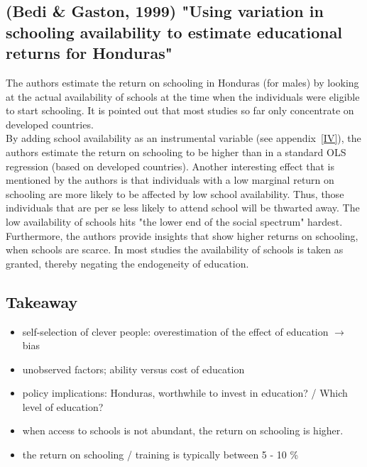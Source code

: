 \documentclass[12pt,a4paper]{article}
\begin{document}
  \subsection{(Bedi \& Gaston, 1999) "Using variation in schooling availability to estimate educational returns for Honduras"} %
  \label{sub:bedi}
  The authors estimate the return on schooling in Honduras (for males) by looking at the actual availability of schools at the
  time when the individuals were eligible to start schooling. It is pointed out that most studies so far only concentrate
  on developed countries.\\
  By adding school availability as an instrumental variable (see appendix~\ref{IV}), the authors estimate the return
  on schooling to be higher than in a standard OLS regression (based on developed countries). Another interesting effect
  that is mentioned by the authors is that individuals with a low marginal return on schooling are more likely to
  be affected by low school availability. Thus, those individuals that are per se less likely to attend school will
  be thwarted away. The low availability of schools hits "the lower end of the social spectrum" hardest.\\
  Furthermore, the authors provide insights that show higher returns on schooling, when schools are scarce. In most
  studies the availability of schools is taken as granted, thereby negating the endogeneity of education.\\

  \subsection{Takeaway} %
    \begin{itemize}
      \item self-selection of clever people: overestimation of the effect of education $\rightarrow$
        bias
      \item unobserved factors; ability versus cost of education
      \item policy implications: Honduras, worthwhile to invest in education? / Which level of
        education?
      \item when access to schools is not abundant, the return on schooling is higher.
      \item the return on schooling / training is typically between 5 - 10 \%
    \end{itemize}
  
\end{document}
